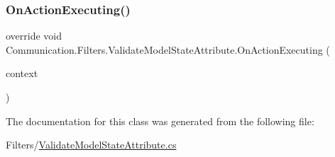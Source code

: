 \subsubsection{\texorpdfstring{On\+Action\+Executing()}{OnActionExecuting()}}
{\footnotesize\ttfamily override void Communication.\+Filters.\+Validate\+Model\+State\+Attribute.\+On\+Action\+Executing (\begin{DoxyParamCaption}\item[{Action\+Executing\+Context}]{context }\end{DoxyParamCaption})}



The documentation for this class was generated from the following file\+:\begin{DoxyCompactItemize}
\item 
Filters/\mbox{\hyperlink{_validate_model_state_attribute_8cs}{Validate\+Model\+State\+Attribute.\+cs}}\end{DoxyCompactItemize}

